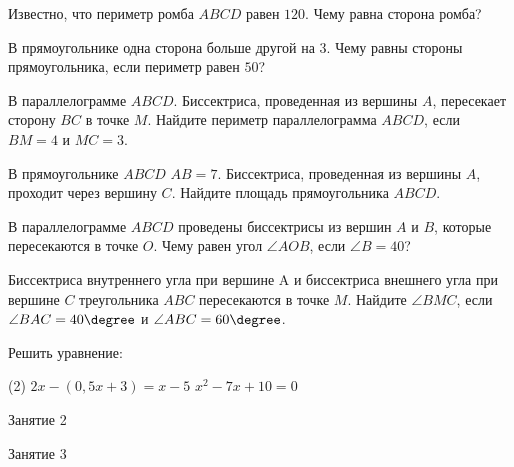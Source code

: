 %
%

\begin{class}[number=1]
	\begin{listofex}
		\item Известно, что периметр ромба \( ABCD \) равен \( 120 \). Чему равна сторона ромба?
		\item В прямоугольнике одна сторона больше другой на \( 3 \). Чему равны стороны прямоугольника, если периметр равен \( 50 \)?
		\item В параллелограмме \( ABCD \). Биссектриса, проведенная из вершины \( A \), пересекает сторону \( BC \) в точке \( M \). Найдите периметр параллелограмма \( ABCD \), если \( BM=4 \) и \( MC=3 \).
		\item В прямоугольнике \( ABCD \) \( AB=7 \). Биссектриса, проведенная из вершины \( A \), проходит через вершину \( C \). Найдите площадь прямоугольника \( ABCD \).
		\item В параллелограмме \( ABCD \) проведены биссектрисы из вершин \( A \) и \( B \), которые пересекаются в точке \( O \). Чему равен угол \( \angle AOB \), если \( \angle B= 40 \)?
		\item Биссектриса внутреннего угла при вершине A и
		биссектриса внешнего угла при вершине \( C \) треугольника \( ABC \)
		пересекаются в точке \( M \). Найдите \( \angle BMC \), если \( \angle BAC = 40\degree \) и \( \angle ABC = 60\degree \).
		\item Решить уравнение:
		\begin{tasks}(2)
			\task \( 2x-(0,5x+3)=x-5 \)
			\task \( x^2-7x+10=0 \)
		\end{tasks}
	\end{listofex}
\end{class}

\begin{class}[number=2]
	\begin{listofex}
		\item Занятие 2
	\end{listofex}
\end{class}

\begin{class}[number=3]
	\begin{listofex}
		\item Занятие 3
	\end{listofex}
\end{class}

